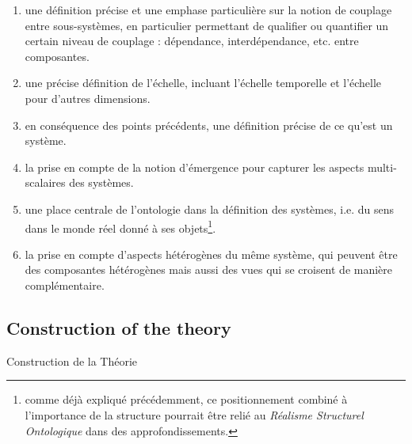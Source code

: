 {\begin{enumerate}
\item une définition précise et une emphase particulière sur la notion de couplage entre sous-systèmes, en particulier permettant de qualifier ou quantifier un certain niveau de couplage : dépendance, interdépendance, etc. entre composantes.
\item une précise définition de l'échelle, incluant l'échelle temporelle et l'échelle pour d'autres dimensions.
\item en conséquence des points précédents, une définition précise de ce qu'est un système.
\item la prise en compte de la notion d'émergence pour capturer les aspects multi-scalaires des systèmes.
\item une place centrale de l'ontologie dans la définition des systèmes, i.e. du sens dans le monde réel donné à ses objets\footnote{comme déjà expliqué précédemment, ce positionnement combiné à l'importance de la structure pourrait être relié au \emph{Réalisme Structurel Ontologique} dans des approfondissements.}.
\item la prise en compte d'aspects hétérogènes du même système, qui peuvent être des composantes hétérogènes mais aussi des vues qui se croisent de manière complémentaire. 
\end{enumerate}
}





\subsection{Construction of the theory}{Construction de la Théorie}

